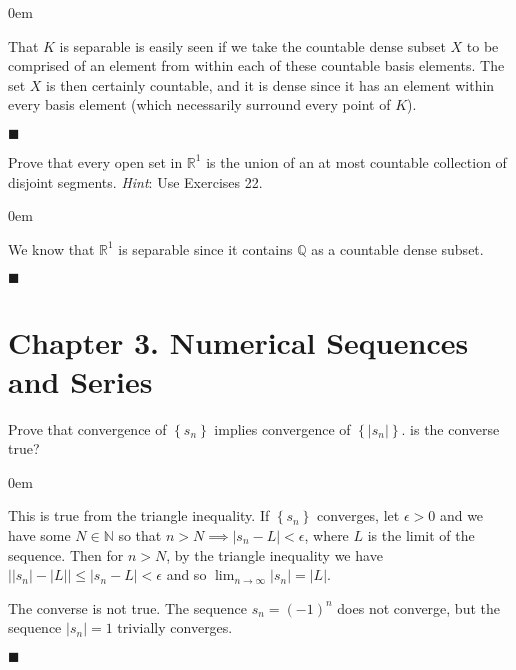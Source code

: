 \documentclass[12pt]{article}
\renewcommand{\qed}{\hfill$\blacksquare$}
\renewenvironment{proof}{\begin{addmargin}[1em]{0em}\begin{newproof}}{\end{newproof}\end{addmargin}\qed}
\newenvironment{problem}[2][Exercise]{\begin{trivlist}
\item[\hskip \labelsep {\bfseries #1}\hskip \labelsep {\bfseries #2.}]}{\end{trivlist}}
\begin{document}
\begin{proof}
That $K$ is separable is easily seen if we take the countable dense subset $X$ to be comprised of an element from within each of these countable basis elements. The set $X$ is then certainly countable, and it is dense since it has an element within every basis element (which necessarily surround every point of $K$).
\end{proof}










\begin{problem}{2.29}
	Prove that every open set in $\mathbb{R}^1$ is the union of an at most countable collection of disjoint segments. \textit{Hint}: Use Exercises 22.
\end{problem}
\begin{proof}
	We know that $\mathbb{R}^1$ is separable since it contains $\mathbb{Q}$ as a countable dense subset. 
\end{proof}





\newpage
\section*{Chapter 3. Numerical Sequences and Series}

\begin{problem}{3.1}
Prove that convergence of $\left\{s_n\right\}$ implies convergence of $\left\{\left|s_n\right|\right\}$. is the converse true?
\end{problem}
\begin{proof}
This is true from the triangle inequality. If $\left\{s_n\right\}$ converges, let $\epsilon>0$ and we have some $N\in \mathbb{N}$ so that $n>N \implies \left| s_n - L\right|<\epsilon$, where $L$ is the limit of the sequence. Then for $n>N$, by the triangle inequality we have $\left|\left|s_n\right|-\left|L\right|\right| \leq \left|s_n-L\right| < \epsilon$ and so $\lim_{n\rightarrow \infty} \left|s_n\right| = \left|L\right|$.

The converse is not true. The sequence $s_n = \left(-1\right)^n$ does not converge, but the sequence $\left|s_n\right|=1$ trivially converges.
\end{proof}
\end{document}
